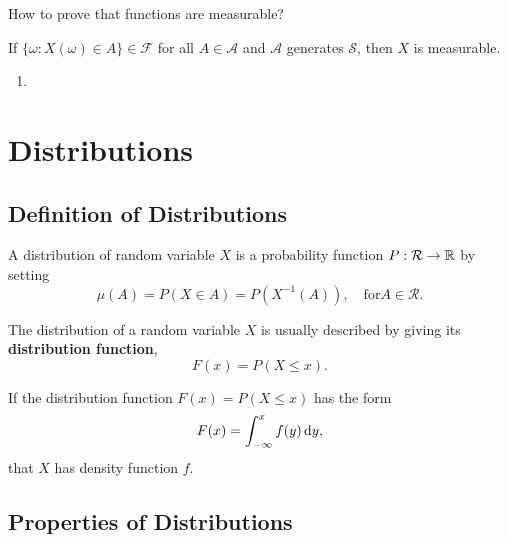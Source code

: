 How to prove that functions are measurable?

\begin{theorem}
	If $\{\omega:X(\omega)\in A\}\in\mathcal{F}$ for all $A\in\mathcal{A}$ and $\mathcal{A}$ generates $\mathcal{S}$, then $X$ is measurable.
\end{theorem}

\begin{enumerate}
	\item
\end{enumerate}

\section{Distributions}

\subsection{Definition of Distributions}

\begin{definition}[Distribution]
	A distribution of random variable $X$ is a probability function $P:\mathcal{R}\rightarrow{\mathbb R}$ by setting
	\begin{equation}
		\mu(A)=P(X\in A)=P\left(X^{-1}(A)\right),\quad\text{for}A\in\mathcal{R}.
	\end{equation}
\end{definition}

\begin{definition}
	The distribution of a random variable $X$ is usually described by giving its \textbf{distribution function},
	\begin{equation}
		F(x)=P(X\leq x).
	\end{equation}
\end{definition}

\begin{definition}
	If the distribution function $F(x)=P(X\leq x)$ has the form
	\begin{equation*}
		F(x)=\int_{-\infty}^{x}f(y)\mathop{}\!\mathrm{d} y,
	\end{equation*}
	that $X$ has density function $f$.
\end{definition}

\subsection{Properties of Distributions}

